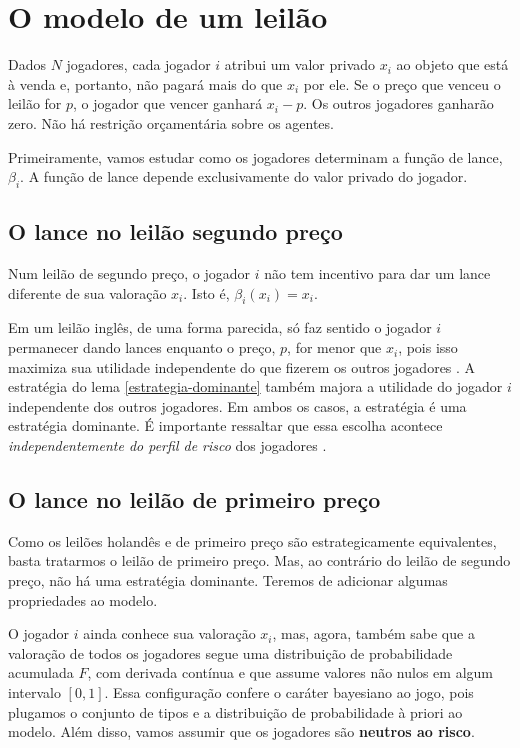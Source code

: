 \section{O modelo de um leilão}

Dados $N$ jogadores, cada jogador $i$ atribui um valor privado $x_i$ ao objeto que está à venda e, portanto, não pagará mais do que $x_i$ por ele. Se o preço que venceu o leilão for $p$, o jogador que vencer ganhará $x_i - p$. Os outros jogadores ganharão zero. Não há restrição orçamentária sobre os agentes.

Primeiramente, vamos estudar como os jogadores determinam a função de lance, $\beta_i$. A função de lance depende exclusivamente do valor privado do jogador.

\subsection{O lance no leilão segundo preço}

\begin{lema}
    \label{estrategia-dominante}
    Num leilão de segundo preço, o jogador $i$ não tem incentivo para dar um lance diferente de sua valoração $x_i$. Isto é, $\beta_{i}(x_i) = x_i$.
\end{lema}

Em um leilão inglês, de uma forma parecida, só faz sentido o jogador $i$ permanecer dando lances enquanto o preço, $p$, for menor que $x_i$, pois isso maximiza sua utilidade independente do que fizerem os outros jogadores \citet{karlin2017game}. A estratégia do lema \ref{estrategia-dominante} também majora a utilidade do jogador $i$ independente dos outros jogadores. Em ambos os casos, a estratégia é uma estratégia dominante. É importante ressaltar que essa escolha acontece \emph{independentemente do perfil de risco} dos jogadores \citet{Shoham2008}.

\subsection{O lance no leilão de primeiro preço}

Como os leilões holandês e de primeiro preço são estrategicamente equivalentes, basta tratarmos o leilão de primeiro preço. Mas, ao contrário do leilão de segundo preço, não há uma estratégia dominante. Teremos de adicionar algumas propriedades ao modelo.

O jogador $i$ ainda conhece sua valoração $x_i$, mas, agora, também sabe que a valoração de todos os jogadores segue uma distribuição de probabilidade acumulada $F$, com derivada contínua e que assume valores não nulos em algum intervalo $[0, 1]$. Essa configuração confere o caráter bayesiano ao jogo, pois plugamos o conjunto de tipos e a distribuição de probabilidade à priori ao modelo. Além disso, vamos assumir que os jogadores são \textbf{neutros ao risco}.

